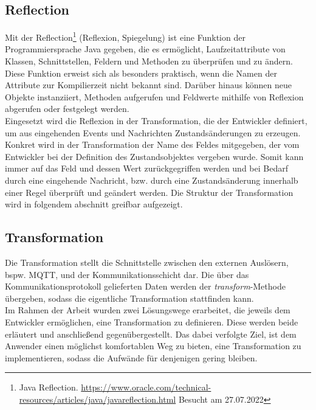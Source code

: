 \subsection{Reflection} 
    Mit der Reflection\footnote{Java Reflection. \url{https://www.oracle.com/technical-resources/articles/java/javareflection.html} Besucht am 27.07.2022} 
    (Reflexion, Spiegelung) ist eine Funktion der Programmiersprache Java gegeben, die es ermöglicht, Laufzeitattribute von Klassen, Schnittstellen, Feldern 
    und Methoden zu überprüfen und zu ändern. Diese Funktion erweist sich als besonders praktisch, wenn die Namen der Attribute zur Kompilierzeit nicht bekannt sind. 
    Darüber hinaus können neue Objekte instanziiert, Methoden aufgerufen und Feldwerte mithilfe von Reflexion abgerufen oder festgelegt werden. 
    \\
    \linebreak
    Eingesetzt wird die Reflexion in der Transformation, die der Entwickler definiert, um aus eingehenden Events und Nachrichten Zustandsänderungen zu erzeugen. Konkret wird in der 
    Transformation der Name des Feldes mitgegeben, der vom Entwickler bei der Definition des Zustandsobjektes vergeben wurde. Somit kann immer auf das Feld und dessen Wert zurückgegriffen werden und bei Bedarf durch eine eingehende Nachricht, bzw. durch eine Zustandsänderung innerhalb einer Regel überprüft und geändert werden. Die Struktur der 
    Transformation wird in folgendem abschnitt greifbar aufgezeigt.

\subsection{Transformation}
    Die Transformation stellt die Schnittstelle zwischen den externen Auslösern, bspw. \acs{MQTT}, und der Kommunikationsschicht dar. 
    Die über das Kommunikationsprotokoll gelieferten Daten werden der \textit{transform}-Methode übergeben, sodass die eigentliche 
    Transformation stattfinden kann. %
    \\
    \linebreak
    Im Rahmen der Arbeit wurden zwei Lösungswege erarbeitet, die jeweils dem Entwickler ermöglichen, eine Transformation zu definieren. Diese werden beide 
    erläutert und anschließend gegenübergestellt. Das dabei verfolgte Ziel, ist dem Anwender einen möglichst komfortablen Weg zu bieten, eine 
    Transformation zu implementieren, sodass die Aufwände für denjenigen gering bleiben.
